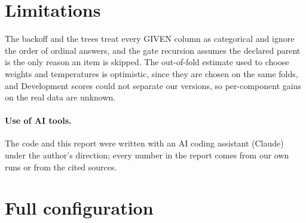 \documentclass{article}
\begin{document}
\section{Limitations}
\label{sec:limitations}

The backoff and the trees treat every GIVEN column as categorical and ignore the
order of ordinal answers, and the gate recursion assumes the declared parent is
the only reason an item is skipped. The out-of-fold estimate used to choose
weights and temperatures is optimistic, since they are chosen on the same folds,
and Development scores could not separate our versions, so per-component gains
on the real data are unknown.

\paragraph{Use of AI tools.} The code and this report were written with an AI
coding assistant (Claude) under the author's direction; every number in the
report comes from our own runs or from the cited sources.




\clearpage
\appendix

\section{Full configuration}
\label{app:config}
\end{document}
